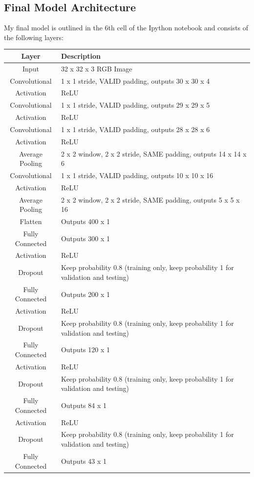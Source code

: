 \documentclass[12pt]{article}
\begin{document}
\subsection{Final Model Architecture}
My final model is outlined in the 6th cell of the Ipython notebook and consists of the following layers:
\begin{center}
\begin{tabular}{|c|p{10cm}|}
\hline
\textbf{Layer} & \textbf{Description} \\
\hline
Input & 32 x 32 x 3 RGB Image \\
\hline
Convolutional & 1 x 1 stride, VALID padding, outputs 30 x 30 x 4 \\
\hline
Activation & ReLU \\
\hline
Convolutional & 1 x 1 stride, VALID padding, outputs 29 x 29 x 5 \\
\hline
Activation & ReLU \\
\hline
Convolutional & 1 x 1 stride, VALID padding, outputs 28 x 28 x 6 \\
\hline
Activation & ReLU \\
\hline
Average Pooling & 2 x 2 window, 2 x 2 stride, SAME padding, outputs 14 x 14 x 6 \\
\hline
Convolutional & 1 x 1 stride, VALID padding, outputs 10 x 10 x 16 \\
\hline
Activation & ReLU \\
\hline
Average Pooling & 2 x 2 window, 2 x 2 stride, SAME padding, outputs 5 x 5 x 16 \\
\hline
Flatten & Outputs 400 x 1 \\
\hline
Fully Connected & Outputs 300 x 1\\
\hline
Activation & ReLU \\
\hline
Dropout & Keep probability 0.8 (training only, keep probability 1 for validation and testing) \\
\hline
Fully Connected & Outputs 200 x 1\\
\hline
Activation & ReLU \\
\hline
Dropout & Keep probability 0.8 (training only, keep probability 1 for validation and testing) \\
\hline
Fully Connected & Outputs 120 x 1\\
\hline
Activation & ReLU \\
\hline
Dropout & Keep probability 0.8 (training only, keep probability 1 for validation and testing) \\
\hline
Fully Connected & Outputs 84 x 1 \\
\hline
Activation & ReLU \\
\hline
Dropout & Keep probability 0.8 (training only, keep probability 1 for validation and testing) \\
\hline
Fully Connected & Outputs 43 x 1 \\
\hline
\end{tabular}
\end{center}
\end{document}
